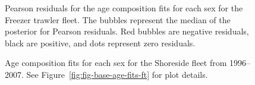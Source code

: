 \documentclass[11pt]{book}
\begin{document}
\begin{figure}[H]

{\centering {} 

}

\caption{Pearson residuals for the age composition fits for each sex for the Freezer trawler fleet. The bubbles represent the median of the posterior for Pearson residuals. Red bubbles are negative residuals, black are positive, and dots represent zero residuals.}\label{fig:fig-base-age-resids-ft}
\end{figure}
\clearpage




\begin{figure}[H]

{\centering {} 

}

\caption{Age composition fits for each sex for the Shoreside fleet from 1996--2007. See Figure~\ref{fig:fig-base-age-fits-ft} for plot details.}\label{fig:fig-base-age-fits-firsthalf-ss}
\end{figure}
\end{document}
